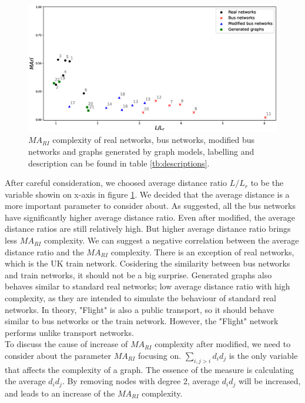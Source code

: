 \documentclass[12pt]{article}
\begin{document}
\begin{figure}[ht]
    \includegraphics[width = \textwidth]{real_networks.eps}
    \caption{$MA_{RI}$ complexity of real networks, bus networks, modified bus networks and graphs generated by graph models, labelling and description can be found in table \ref{tb:descriptions}.}
    \label{fig:real_networks}
\end{figure}
After careful consideration, we choosed average distance ratio $L/L_r$ to be the variable showin on x-axis in figure \ref{fig:real_networks}. We decided that the average distance is a more important parameter to consider about. As suggested, all the bus networks have significantly higher average distance ratio. Even after modified, the average distance ratios are still relatively high. But higher average distance ratio brings less $MA_{RI}$ complexity. We can suggest a negative correlation between the average distance ratio and the $MA_{RI}$ complexity. There is an exception of real networks, which is the UK train network. Cosidering the similarity between bus networks and train networks, it should not be a big surprise. Generated graphs also behaves similar to standard real networks; low average distance ratio with high complexity, as they are intended to simulate the behaviour of standard real networks. In theory, "Flight" is also a public transport, so it should behave similar to bus networks or the train network. However, the "Flight" network performs unlike transport networks.\\
To discuss the cause of increase of $MA_{RI}$ complexity after modified, we need to consider about the parameter $MA_{RI}$ focusing on. $\sum_{i,j>i}d_id_j$ is the only variable that affects the complexity of a graph. The essence of the measure is calculating the average $d_id_j$. By removing nodes with degree 2, average $d_id_j$ will be increased, and leads to an increase of the $MA_{RI}$ complexity.
\end{document}
